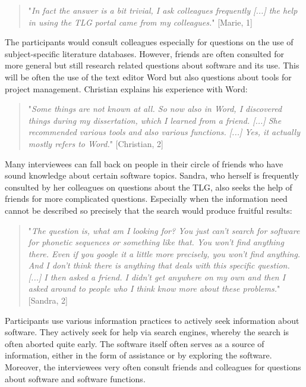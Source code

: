 \documentclass[12pt, a4paper, titlepage, oneside, abstract=true, toc=listof, toc=bibliography]{scrreprt}
\begin{document}
{%
\begin{quotation}
"\textit{In fact the answer is a bit trivial, I ask colleagues frequently [...]  the help in using the TLG portal came from my colleagues.}" [Marie, 1]
\end{quotation}

The participants would consult colleagues especially for questions on the use of subject-specific literature databases. 
However, friends are often consulted for more general but still research related questions about software and its use. This will be often the use of the text editor Word but also questions about tools for project management. Christian explains his experience with Word:

\begin{quotation}
"\textit{Some things are not known at all. So now also in Word, I discovered things during my dissertation, which I learned from a friend. [...] She recommended various tools and also various functions. [...] Yes, it actually mostly refers to Word.}" [Christian, 2]
\end{quotation}

Many interviewees can fall back on people in their circle of friends who have sound knowledge about certain software topics. Sandra, who herself is frequently consulted by her colleagues on questions about the TLG, also seeks the help of friends for more complicated questions. Especially when the information need cannot be described so precisely that the search would produce fruitful results:

\begin{quotation}
"\textit{The question is, what am I looking for? You just can't search for software for phonetic sequences or something like that. You won't find anything there. Even if you google it a little more precisely, you won't find anything. And I don't think there is anything that deals with this specific question. [...] I then asked a friend. I didn't get anywhere on my own and then I asked around to people who I think know more about these problems.}" [Sandra, 2]
\end{quotation}

Participants use various information practices to actively seek information about software. They actively seek for help via search engines, whereby the search is often aborted quite early. The software itself often serves as a source of information, either in the form of assistance or by exploring the software. Moreover, the interviewees very often consult friends and colleagues for questions about software and software functions.

}
\end{document}
